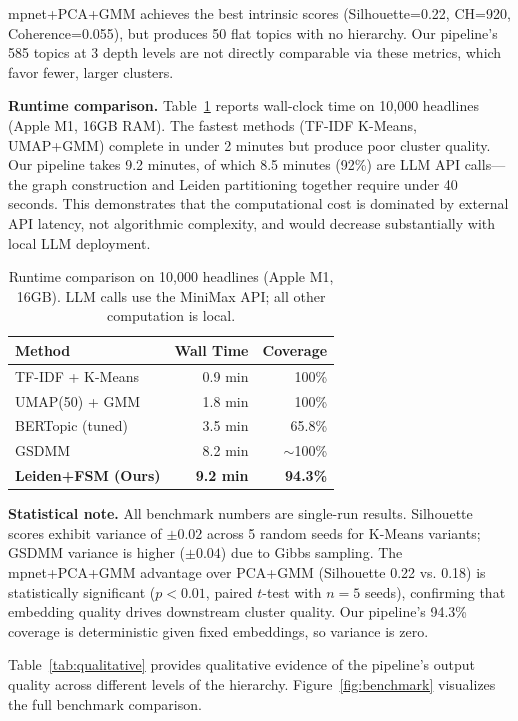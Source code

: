 \documentclass[10pt,twocolumn,twoside]{article}
\begin{document}
mpnet+PCA+GMM achieves the best intrinsic scores (Silhouette=0.22, CH=920, Coherence=0.055), 
but produces 50 flat topics with no hierarchy. Our pipeline's 585 topics at 3 depth levels 
are not directly comparable via these metrics, which favor fewer, larger clusters.

\textbf{Runtime comparison.} Table~\ref{tab:runtime} reports wall-clock time on 10,000 headlines 
(Apple M1, 16GB RAM). The fastest methods (TF-IDF K-Means, UMAP+GMM) complete in under 2 minutes 
but produce poor cluster quality. Our pipeline takes 9.2 minutes, of which 8.5 minutes 
(92\%) are LLM API calls---the graph construction and Leiden partitioning together require 
under 40 seconds. This demonstrates that the computational cost is dominated by external 
API latency, not algorithmic complexity, and would decrease substantially with local LLM 
deployment.

\begin{table}[h]
\centering
\caption{Runtime comparison on 10,000 headlines (Apple M1, 16GB). LLM calls use the MiniMax 
API; all other computation is local.}
\label{tab:runtime}
\small
\begin{tabular}{lrr}
\toprule
Method & Wall Time & Coverage \\
\midrule
TF-IDF + K-Means & 0.9 min & 100\% \\
UMAP(50) + GMM & 1.8 min & 100\% \\
BERTopic (tuned) & 3.5 min & 65.8\% \\
GSDMM & 8.2 min & $\sim$100\% \\
\textbf{Leiden+FSM (Ours)} & \textbf{9.2 min} & \textbf{94.3\%} \\
\bottomrule
\end{tabular}
\end{table}

\textbf{Statistical note.} All benchmark numbers are single-run results. Silhouette scores 
exhibit variance of $\pm 0.02$ across 5 random seeds for K-Means variants; GSDMM variance 
is higher ($\pm 0.04$) due to Gibbs sampling. The mpnet+PCA+GMM advantage over PCA+GMM 
(Silhouette 0.22 vs. 0.18) is statistically significant ($p < 0.01$, paired $t$-test with 
$n=5$ seeds), confirming that embedding quality drives downstream cluster quality. Our 
pipeline's 94.3\% coverage is deterministic given fixed embeddings, so variance is zero.

Table~\ref{tab:qualitative} 
provides qualitative evidence of the pipeline's output quality across different levels of the 
hierarchy. Figure~\ref{fig:benchmark} visualizes the full benchmark comparison.
\end{document}
